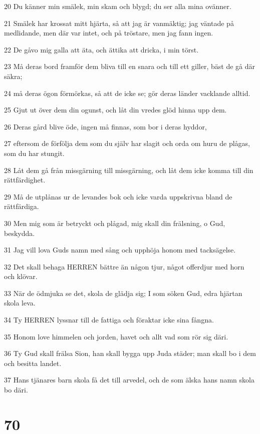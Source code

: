 \par 20 Du känner min smälek, min skam och blygd; du ser alla mina ovänner.
\par 21 Smälek har krossat mitt hjärta, så att jag är vanmäktig; jag väntade på medlidande, men där var intet, och på tröstare, men jag fann ingen.
\par 22 De gåvo mig galla att äta, och ättika att dricka, i min törst.
\par 23 Må deras bord framför dem bliva till en snara och till ett giller, bäst de gå där säkra;
\par 24 må deras ögon förmörkas, så att de icke se; gör deras länder vacklande alltid.
\par 25 Gjut ut över dem din ogunst, och låt din vredes glöd hinna upp dem.
\par 26 Deras gård blive öde, ingen må finnas, som bor i deras hyddor,
\par 27 eftersom de förfölja dem som du själv har slagit och orda om huru de plågas, som du har stungit.
\par 28 Låt dem gå från missgärning till missgärning, och låt dem icke komma till din rättfärdighet.
\par 29 Må de utplånas ur de levandes bok och icke varda uppskrivna bland de rättfärdiga.
\par 30 Men mig som är betryckt och plågad, mig skall din frälsning, o Gud, beskydda.
\par 31 Jag vill lova Guds namn med sång och upphöja honom med tacksägelse.
\par 32 Det skall behaga HERREN bättre än någon tjur, något offerdjur med horn och klövar.
\par 33 När de ödmjuka se det, skola de glädja sig; I som söken Gud, edra hjärtan skola leva.
\par 34 Ty HERREN lyssnar till de fattiga och föraktar icke sina fångna.
\par 35 Honom love himmelen och jorden, havet och allt vad som rör sig däri.
\par 36 Ty Gud skall frälsa Sion, han skall bygga upp Juda städer; man skall bo i dem och besitta landet.
\par 37 Hans tjänares barn skola få det till arvedel, och de som älska hans namn skola bo däri.

\chapter{70}

